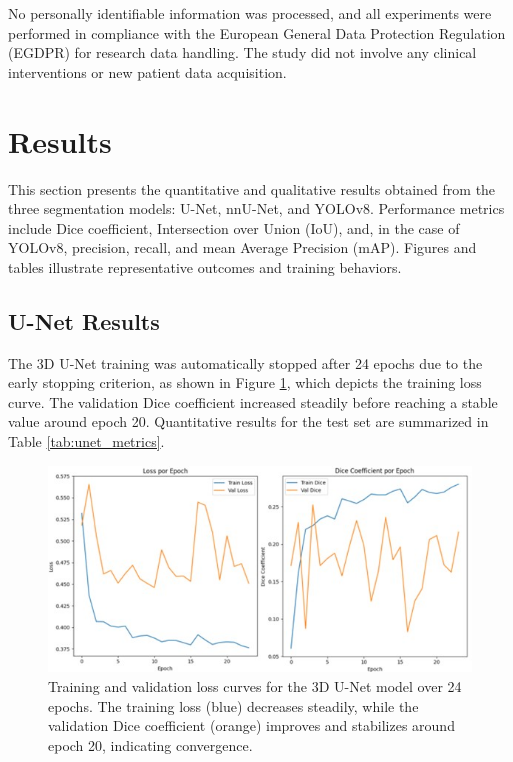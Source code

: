 \documentclass[12pt]{article}
\begin{document}
No personally identifiable information was processed, and all experiments were performed in compliance with the European General Data Protection Regulation (EGDPR) for research data handling. The study did not involve any clinical interventions or new patient data acquisition.

\section{Results} \label{sec:results}

This section presents the quantitative and qualitative results obtained from the three segmentation models: U-Net, nnU-Net, and YOLOv8. Performance metrics include Dice coefficient, Intersection over Union (IoU), and, in the case of YOLOv8, precision, recall, and mean Average Precision (mAP). Figures and tables illustrate representative outcomes and training behaviors.

\subsection{U-Net Results} \label{subsec:unet}

The 3D U-Net training was automatically stopped after 24 epochs due to the early stopping criterion, as shown in Figure \ref{fig:unet_loss_curve}, which depicts the training loss curve. The validation Dice coefficient increased steadily before reaching a stable value around epoch 20. Quantitative results for the test set are summarized in Table \ref{tab:unet_metrics}.

\begin{figure}[tp]
    \centering
    \includegraphics[width=\textwidth]{figures/Figure 1.jpg}
    \caption{Training and validation loss curves for the 3D U-Net model over 24 epochs. The training loss (blue) decreases steadily, while the validation Dice coefficient (orange) improves and stabilizes around epoch 20, indicating convergence.}
    \label{fig:unet_loss_curve}
\end{figure}
\end{document}
